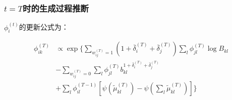 \subsubsection{$t=T$时的生成过程推断}

$\phi_i^{(t)}$的更新公式为：



\begin{equation}
\begin{split}
\phi_{ik}^{(T)} & \propto \exp\{ \sum_{w_{ij}^{(T)}=1} (1+\bar{\delta}_i^{(T)}+\bar{\delta}_j^{(T)}) \sum_l \phi_{jl}^{(T)} \log B_{kl} \\
& -\sum_{w_{ij}^{(T)}=0} \sum_l \phi_{jl}^{(T)}  b_{kl}^{1+\bar{\delta}_i^{(T)}+\bar{\delta}_j^{(T)}}  \\
& + \sum_l \phi_{il}^{(T-1)} [\psi(\tilde{\mu}_{kl}^{(T)}) - \psi(\sum_l \tilde{\mu}_{kl}^{(T)})] \}
\end{split}
\label{eq:phiT}
\end{equation}

